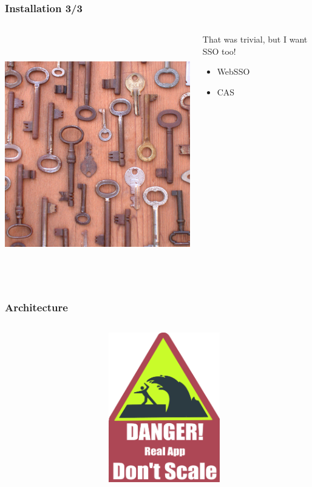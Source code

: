 \documentclass{beamer}
\begin{document}
\begin{frame}
    \frametitle{Installation 3/3}


 \begin{columns}
 \begin{column}{0.34\textwidth}
    \includegraphics[height=10.5cm]{pics/sso.jpg}
 \end{column}
 \begin{column}{0.90\textwidth}
    \begin{block}{That was trivial, but I want SSO too!}
        \begin{itemize}
            \item WebSSO
            \item CAS
        \end{itemize}
    \end{block}
 \end{column}
\end{columns}

\end{frame}

\begin{frame}
    \frametitle{Architecture}

 \begin{columns}
 \begin{column}{0.34\textwidth}
 \end{column}
 \begin{column}{0.90\textwidth}
    \includegraphics[height=6.5cm]{pics/scale.pdf}
 \end{column}
\end{columns}

\end{frame}
\end{document}
